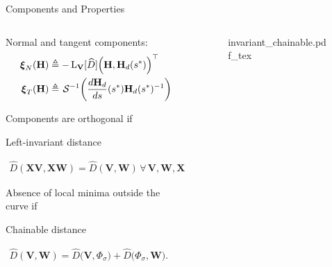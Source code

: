 \begin{frame}{Components and Properties}
    \begin{columns}[c]
        \begin{column}{0.5\linewidth}
            Normal and tangent components:
            \begin{align*}
                \boldsymbol{\xi}_N(\mathbf{H}) &\triangleq -\Lop_{\mathbf{V}}[\widehat{D}]\Bigl(\mathbf{H}, \mathbf{H}_d(s^*)\Bigr)^{\top}\\
                \boldsymbol{\xi}_T(\mathbf{H}) &\triangleq  \SL^{-1}\biggl(\frac{d\mathbf{H}_d}{ds}(s^*)\mathbf{H}_d(s^*)^{-1}\biggr)
            \end{align*}

            Components are orthogonal if
                \begin{exampleblock}{Left-invariant distance}
                    {\centering $\displaystyle 
                    \begin{aligned} \widehat{D}(\mathbf{X}\mathbf{V}, \mathbf{X}\mathbf{W}) = \widehat{D}(\mathbf{V}, \mathbf{W})\,\forall\,\mathbf{V}, \mathbf{W}, \mathbf{X} \in G.
                    \end{aligned}$ 
                    \par}%
                \end{exampleblock}
                Absence of local minima outside the curve if
                \begin{exampleblock}{Chainable distance}
                    {\centering $\displaystyle
                    \begin{aligned}
                        \widehat{D}(\mathbf{V}, \mathbf{W}) = \widehat{D}\bigl(\mathbf{V}, \Phi_\sigma\bigr) + \widehat{D}\bigl(\Phi_\sigma, \mathbf{W} \bigr).
                    \end{aligned}$
                    \par}%
                \end{exampleblock}
        \end{column}
        \begin{column}{0.5\linewidth}
            \begin{figure}[ht!]
                \centering
                \def\svgwidth{\linewidth}
                {\scriptsize{invariant_chainable.pdf_tex}}
            \end{figure}
        \end{column}
    \end{columns}
    
\end{frame}

